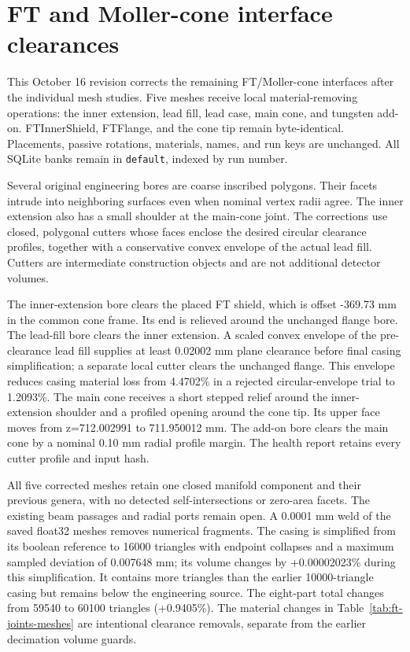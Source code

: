 \FloatBarrier
\section{FT and Moller-cone interface clearances}
\label{sec:ft-joints}

This October 16 revision corrects the remaining FT/Moller-cone interfaces after the individual mesh studies.
Five meshes receive local material-removing operations: the inner extension, lead fill, lead case, main cone,
and tungsten add-on. FTInnerShield, FTFlange, and the cone tip remain byte-identical. Placements, passive
rotations, materials, names, and run keys are unchanged. All SQLite banks remain in \texttt{default}, indexed
by run number.

Several original engineering bores are coarse inscribed polygons. Their facets intrude into neighboring
surfaces even when nominal vertex radii agree. The inner extension also has a small shoulder at the main-cone
joint. The corrections use closed, polygonal cutters whose faces enclose the desired circular clearance
profiles, together with a conservative convex envelope of the actual lead fill. Cutters are intermediate
construction objects and are not additional detector volumes.

The inner-extension bore clears the placed FT shield, which is offset -369.73 mm in the common cone frame. Its
end is relieved around the unchanged flange bore. The lead-fill bore clears the inner extension. A scaled
convex envelope of the pre-clearance lead fill supplies at least 0.02002 mm plane clearance before final
casing simplification; a separate local cutter clears the unchanged flange. This envelope reduces casing
material loss from 4.4702\% in a rejected circular-envelope trial to 1.2093\%. The main cone receives a short
stepped relief around the inner-extension shoulder and a profiled opening around the cone tip. Its upper face
moves from z=712.002991 to 711.950012 mm. The add-on bore clears the main cone by a nominal 0.10 mm radial
profile margin. The health report retains every cutter profile and input hash.

All five corrected meshes retain one closed manifold component and their previous genera, with no detected
self-intersections or zero-area facets. The existing beam passages and radial ports remain open. A 0.0001 mm
weld of the saved float32 meshes removes numerical fragments. The casing is simplified from its boolean
reference to 16000 triangles with endpoint collapses and a maximum sampled deviation of 0.007648 mm; its
volume changes by +0.00002023\% during this simplification. It contains more triangles than the earlier
10000-triangle casing but remains below the engineering source. The eight-part total changes from 59540 to
60100 triangles (+0.9405\%). The material changes in Table~\ref{tab:ft-joints-meshes} are intentional
clearance removals, separate from the earlier decimation volume guards.

